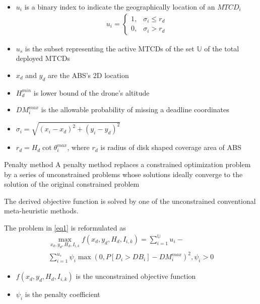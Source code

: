 \documentclass{beamer}
\begin{document}
\begin{frame}{}
    \begin{block}{}
    \begin{itemize}
        \item $u_i$ is a binary index to indicate the geographically location of an $MTCD_i$
        \begin{align}
            u_i =
            \begin{cases}
                    1, & \sigma_i\leq r_d\\
                    0, & \sigma_i>r_d
            \end{cases}
        \end{align}
        \item $u_s$ is the subset representing the active MTCDs of the set $\mathbb{U}$ of the total deployed MTCDs
        \item $x_d$ and $y_d$ are the ABS’s 2D location
        \item $H_d^{min}$ is lower bound of the drone’s altitude
        \item $DM_i^{max}$ is the allowable probability of missing a deadline coordinates
        \item $\sigma_i=\sqrt{(x_i-x_d)^2+(y_i-y_d)^2}$
        \item $r_d=H_d\cot{\theta_i^{max}}$, where $r_d$ is radius of disk shaped coverage area of ABS
    \end{itemize}
    \end{block}
\end{frame}
\begin{frame}{}
    \begin{block}{Penalty method}
    A penalty method replaces a constrained optimization problem by a series of unconstrained problems whose solutions ideally converge to the solution of the original constrained problem
    \end{block}
    \begin{block}{}
    The derived objective function is solved by one of the unconstrained conventional meta-heuristic methods.
    
    The problem in \eqref{eq1} is reformulated as
    \begin{multline}\label{eq2}
        \max\limits_{x_d, y_d, H_d, I_{i, k}} f(x_d, y_d, H_d, I_{i, k}) = \sum\limits_{i = 1}^{\mathbb{U}}u_i -\\ \sum\limits_{i = 1}^{u_s}\psi_i\max(0,P[D_i > DB_i] - DM_i^{max})^2, \psi_i>0
    \end{multline}
    \end{block}
    \begin{block}{}
    \begin{itemize}
        \item  $f(x_d, y_d, H_d, I_{i, k})$ is the unconstrained objective function
        \item $\psi_i$ is the penalty coefficient
    \end{itemize}
\end{block}
\end{frame}
\end{document}
